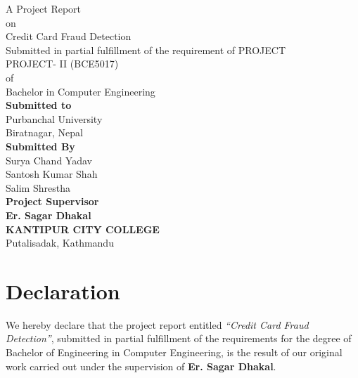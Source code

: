 \documentclass[12pt,a4paper]{report}
\newcommand{\projecttitle}{Credit Card Fraud Detection}
\newcommand{\supervisor}{Er. Sagar Dhakal}
\newcommand{\college}{Kantipur City College}
\newcommand{\collegeaddress}{Putalisadak, Kathmandu}
\begin{document}
\begin{titlepage}
  \thispagestyle{empty}
  \singlespacing
  \centering
  \vspace*{0.35cm}

  {\Large A Project Report}\\[0.65cm]
  {\Large on}\\[0.65cm]
  {\LARGE Credit Card Fraud Detection}\\[1.05cm]

  {\Large Submitted in partial fulfillment of the requirement of PROJECT}\\[0.55cm]
  {\Large PROJECT- II (BCE5017)}\\[0.55cm]
  {\Large of}\\[0.55cm]
  {\Large Bachelor in Computer Engineering}\\[1.45cm]

  {\Large \textbf{Submitted to}}\\[0.55cm]
  {\Large Purbanchal University}\\[0.45cm]
  {\Large Biratnagar, Nepal}\\[1.30cm]

  {\Large \textbf{Submitted By}}\\[0.55cm]
  {\Large Surya Chand Yadav}\\[0.35cm]
  {\Large Santosh Kumar Shah}\\[0.35cm]
  {\Large Salim Shrestha}\\[1.20cm]

  {\Large \textbf{Project Supervisor}}\\[0.45cm]
  {\Large \textbf{\supervisor}}\\[1.40cm]

  {\Large \textbf{\MakeUppercase{\college}}}\\[0.35cm]
  {\Large \collegeaddress}
\end{titlepage}

\hypersetup{pageanchor=true}
\setcounter{page}{2}
\onehalfspacing

\chapter*{Declaration}

We hereby declare that the project report entitled \textit{``\projecttitle''}, submitted in partial fulfillment of the requirements for the degree of Bachelor of Engineering in Computer Engineering, is the result of our original work carried out under the supervision of \textbf{\supervisor}.
\end{document}
